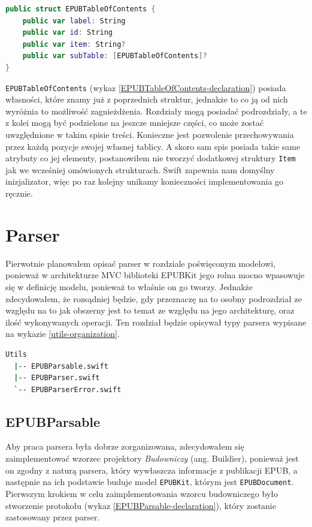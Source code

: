 \begin{lstlisting}[caption={Struktura EPUBTableOfContents}, language=swift,label={EPUBTableOfContents-declaration}]
public struct EPUBTableOfContents {
    public var label: String
    public var id: String
    public var item: String?
    public var subTable: [EPUBTableOfContents]?
}
\end{lstlisting}

\texttt{EPUBTableOfContents} (wykaz \ref{EPUBTableOfContents-declaration})  posiada własności, które znamy już z poprzednich struktur, jednakże to co ją od nich wyróżnia to możliwość zagnieżdżenia. Rozdziały mogą posiadać podrozdziały, a te z kolei mogą być podzielone na jeszcze mniejsze części, co może zostać uwzględnione w takim spisie treści. Konieczne jest pozwolenie przechowywania przez każdą pozycje swojej własnej tablicy. A skoro sam spis posiada takie same atrybuty co jej elementy, postanowiłem nie tworzyć dodatkowej struktury \texttt{Item} jak we wcześniej omówionych strukturach. Swift zapewnia nam domyślny inizjalizator, więc po raz kolejny unikamy konieczności implementowania go ręcznie.

\section{Parser}

Pierwotnie planowałem opisać parser w rozdziale poświęconym modelowi, ponieważ w architekturze MVC biblioteki EPUBKit jego rolna mocno wpasowuje się w definicję modelu, ponieważ to właśnie on go tworzy. Jednakże zdecydowałem, że rozsądniej będzie, gdy przeznaczę na to osobny podrozdział ze względu na to jak obszerny jest to temat ze względu na jego architekturę, oraz ilość wykonywanych operacji. Ten rozdział będzie opisywał typy parsera wypisane na wykazie \ref{utils-organization}.

\begin{lstlisting}[caption={Struktura folderu narzędzi służących modelowi EPUBKit}, language=bash,label=utils-organization]
  Utils
  |-- EPUBParsable.swift
  |-- EPUBParser.swift
  `-- EPUBParserError.swift
\end{lstlisting}

\subsection{EPUBParsable}

Aby praca parsera była dobrze zorganizowana, zdecydowałem się zaimplementować wzorzec projektory \textit{Budowniczy} (ang. Buildier), ponieważ jest on zgodny z naturą parsera, który wywłaszcza informacje z publikacji EPUB, a następnie na ich podstawie buduje model \texttt{EPUBKit}, którym jest \texttt{EPUBDocument}. Pierwszym krokiem w celu zaimplementowania wzorcu budowniczego było stworzenie protokołu (wykaz \ref{EPUBParsable-declaration}), który zostanie zastosowany przez parser.

